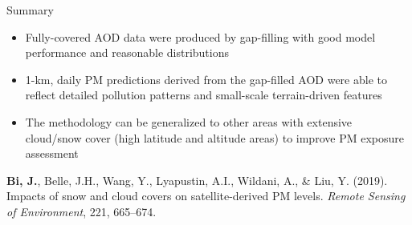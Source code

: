 \begin{frame}{Summary}
    \begin{itemize}
    \item Fully-covered AOD data were produced by gap-filling with good model performance and reasonable distributions
    \item 1-km, daily PM predictions derived from the gap-filled AOD were able to reflect detailed pollution patterns and small-scale terrain-driven features
    \item The methodology can be generalized to other areas with extensive cloud/snow cover (high latitude and altitude areas) to improve PM exposure assessment
    \end{itemize}
    \vspace{1cm}
    \begin{spacing}{0.3}
    \scriptsize \textbf{Bi, J.}, Belle, J.H., Wang, Y., Lyapustin, A.I., Wildani, A., \& Liu, Y. (2019). Impacts of snow and cloud covers on satellite-derived PM levels. \textit{Remote Sensing of Environment}, 221, 665–674. 
    \end{spacing}
\end{frame}